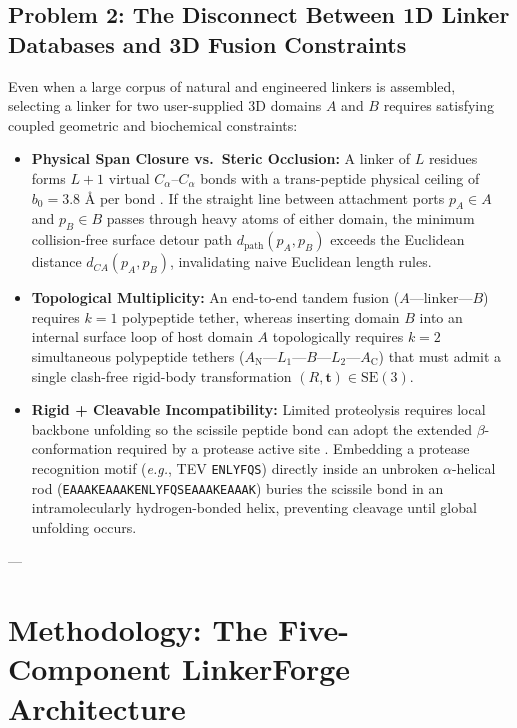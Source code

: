 \documentclass[11pt]{article}
\begin{document}
\subsection{Problem 2: The Disconnect Between 1D Linker Databases and 3D Fusion Constraints}
Even when a large corpus of natural and engineered linkers is assembled, selecting a linker for two user-supplied 3D domains $A$ and $B$ requires satisfying coupled geometric and biochemical constraints:
\begin{itemize}
  \item \textbf{Physical Span Closure vs.\ Steric Occlusion:} A linker of $L$ residues forms $L+1$ virtual $C_\alpha\text{--}C_\alpha$ bonds with a trans-peptide physical ceiling of $b_0 = 3.8\text{ \AA}$ per bond \cite{vanrosmalen2017gs,pauling1951sheet}. If the straight line between attachment ports $p_A \in A$ and $p_B \in B$ passes through heavy atoms of either domain, the minimum collision-free surface detour path $d_{\text{path}}(p_A, p_B)$ exceeds the Euclidean distance $d_{CA}(p_A, p_B)$, invalidating naive Euclidean length rules.
  \item \textbf{Topological Multiplicity:} An end-to-end tandem fusion ($A\text{---linker---}B$) requires $k=1$ polypeptide tether, whereas inserting domain $B$ into an internal surface loop of host domain $A$ \cite{berrondo2018loodo,wolf2025prodomino} topologically requires $k=2$ simultaneous polypeptide tethers ($A_{\text{N}}\text{---}L_1\text{---}B\text{---}L_2\text{---}A_{\text{C}}$) that must admit a single clash-free rigid-body transformation $(R, \mathbf{t}) \in \text{SE}(3)$.
  \item \textbf{Rigid + Cleavable Incompatibility:} Limited proteolysis requires local backbone unfolding so the scissile peptide bond can adopt the extended $\beta$-conformation required by a protease active site \cite{hubbard1994proteolysis}. Embedding a protease recognition motif (\emph{e.g.}, TEV \texttt{ENLYFQS}) directly inside an unbroken $\alpha$-helical rod (\texttt{EAAAKEAAAKENLYFQSEAAAKEAAAK}) buries the scissile bond in an intramolecularly hydrogen-bonded helix, preventing cleavage until global unfolding occurs.
\end{itemize}

---

\section{Methodology: The Five-Component LinkerForge Architecture}
\label{sec:methods}
\end{document}
